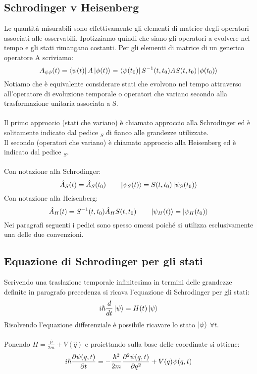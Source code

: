 \documentclass{article}
\begin{document}
\subsection{Schrodinger v Heisenberg}
Le quantità misurabili sono effettivamente gli elementi di matrice degli operatori associati alle osservabili. Ipotizziamo quindi che siano gli operatori a evolvere nel tempo e gli stati rimangano costanti. Per gli elementi di matrice di un generico operatore A scriviamo:
$$ A_{\psi\phi}(t)=\bra{\psi(t)}A\ket{\phi(t)}=\bra{\psi(t_0)}S^{-1}(t,t_0)AS(t,t_0)\ket{\phi(t_0)} $$
Notiamo che è equivalente considerare stati che evolvono nel tempo attraverso all'operatore di evoluzione temporale o operatori che variano secondo alla trasformazione unitaria associata a S.\\\\
Il primo approccio (stati che variano) è chiamato approccio alla Schrodinger ed è solitamente indicato dal pedice $_S$ di fianco alle grandezze utilizzate.\\
Il secondo (operatori che variano) è chiamato approccio alla Heisenberg ed è indicato dal pedice $_S$.\\\\
Con notazione alla Schrodinger:
$$ \hat{A}_S(t)=\hat{A}_S(t_0) \qquad \ket{\psi_S(t)}=S(t,t_0)\ket{\psi_S(t_0)} $$
Con notazione alla Heisenberg:
$$ \hat{A}_H(t)=S^{-1}(t,t_0)\hat{A}_HS(t,t_0) \qquad \ket{\psi_H(t)}=\ket{\psi_H(t_0)} $$
Nei paragrafi seguenti i pedici sono spesso omessi poiché si utilizza esclusivamente una delle due convenzioni.

\subsection{Equazione di Schrodinger per gli stati}
Scrivendo una traslazione temporale infinitesima in termini delle grandezze definite in paragrafo precedenza si ricava l'equazione di Schrodinger per gli stati:
$$ i\hbar\frac{d}{dt}\ket{\psi}=H(t)\ket{\psi} $$
Risolvendo l'equazione differenziale è possibile ricavare lo stato $\ket{\psi}$ $\forall t$.\\\\
Ponendo $H=\frac{\hat{p}}{2m}+V(\hat{q})$ e proiettando sulla base delle coordinate si ottiene:
$$ i\hbar\pdv{\psi(q,t)}{t}=-\frac{\hbar^2}{2m}\pdv[2]{\psi(q,t)}{q}+V(q)\psi(q,t)$$
\end{document}
